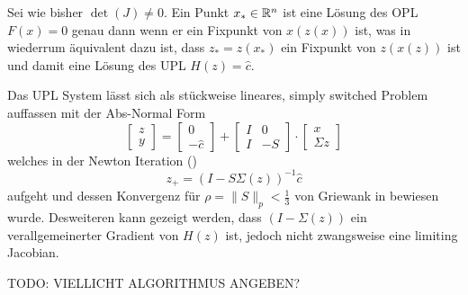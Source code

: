\begin{theorem}
 Sei wie bisher $\det(J)\neq 0$. Ein Punkt $x_*\in \mathbb{R}^n$ ist eine Lösung des OPL $F(x)=0$ genau dann wenn er ein Fixpunkt von $x(z(x))$ ist, was in wiederrum äquivalent dazu ist, dass $z_*=z(x_*)$ ein Fixpunkt von $z(x(z))$ ist und damit eine Lösung des UPL $H(z)=\hat c$.
\end{theorem}

Das UPL System lässt sich als stückweise lineares, simply switched Problem auffassen mit der Abs-Normal Form
\[
 \begin{bmatrix}
  z\\
  y
 \end{bmatrix}
=
 \begin{bmatrix}
  0\\
  -\hat c
 \end{bmatrix}
+
 \begin{bmatrix}
  I & 0\\
  I & -S
 \end{bmatrix}
\cdot
 \begin{bmatrix}
  x\\
  \Sigma z
 \end{bmatrix}
\]
welches in der Newton Iteration (\cite[S.20]{plan})
\begin{equation}
\label{eq:unfoldedNewton}
 z_+ = (I-S\Sigma(z))^{-1}\hat c
\end{equation}
aufgeht und dessen Konvergenz für $\rho = \|S\|_p <\frac{1}{3}$ von Griewank in \cite[Prop. 7.3]{plan} bewiesen wurde. 
Desweiteren kann gezeigt werden, dass $(I-\Sigma(z))$ ein verallgemeinerter Gradient von $H(z)$ ist, jedoch nicht zwangsweise eine limiting Jacobian.
 
TODO: VIELLICHT ALGORITHMUS ANGEBEN?
